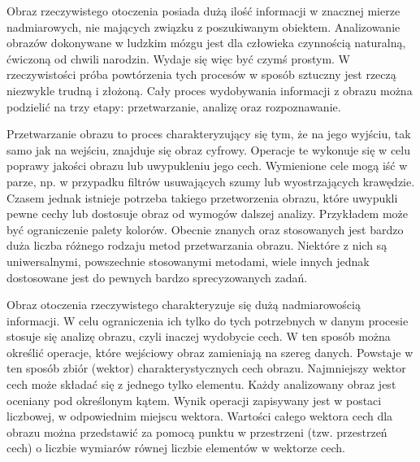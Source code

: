 Obraz rzeczywistego otoczenia posiada dużą ilość informacji w znacznej mierze nadmiarowych, nie mających związku z poszukiwanym obiektem. Analizowanie obrazów dokonywane w ludzkim mózgu jest dla człowieka czynnością naturalną, ćwiczoną od chwili narodzin. Wydaje się więc być czymś prostym. W rzeczywistości próba powtórzenia tych procesów w sposób sztuczny jest rzeczą niezwykle trudną i złożoną. Cały proces wydobywania informacji z obrazu można podzielić na trzy etapy: przetwarzanie, analizę oraz rozpoznawanie.

Przetwarzanie obrazu to proces charakteryzujący się tym, że na jego wyjściu, tak samo jak na wejściu, znajduje się obraz cyfrowy. Operacje te wykonuje się w celu poprawy jakości obrazu lub uwypukleniu jego cech. Wymienione cele mogą iść w parze, np. w przypadku filtrów usuwających szumy lub wyostrzających krawędzie. Czasem jednak istnieje potrzeba takiego przetworzenia obrazu, które uwypukli pewne cechy lub dostosuje obraz od wymogów dalszej analizy. Przykładem może być ograniczenie palety kolorów. Obecnie znanych oraz stosowanych jest bardzo duża liczba różnego rodzaju metod przetwarzania obrazu. Niektóre z nich są uniwersalnymi, powszechnie stosowanymi metodami, wiele innych jednak dostosowane jest do pewnych bardzo sprecyzowanych zadań.

Obraz otoczenia rzeczywistego charakteryzuje się dużą nadmiarowością informacji. W celu ograniczenia ich tylko do tych potrzebnych w danym procesie stosuje się analizę obrazu, czyli inaczej wydobycie cech. W ten sposób można określić operacje, które wejściowy obraz zamieniają na szereg danych. Powstaje w ten sposób zbiór (wektor) charakterystycznych cech obrazu. Najmniejszy wektor cech może składać się z jednego tylko elementu. Każdy analizowany obraz jest oceniany pod określonym kątem. Wynik operacji zapisywany jest w postaci liczbowej, w odpowiednim miejscu wektora. Wartości całego wektora cech dla obrazu można przedstawić za pomocą punktu w przestrzeni (tzw. przestrzeń cech) o liczbie wymiarów równej liczbie elementów w wektorze cech.

